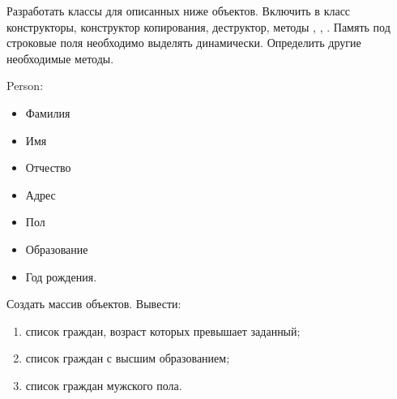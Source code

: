 
Разработать классы для описанных ниже объектов. Включить в класс
конструкторы, конструктор копирования, деструктор, методы ,
, . Память под строковые поля необходимо выделять
динамически. Определить другие необходимые методы.

Person:
\begin{itemize}
	\item Фамилия
	\item Имя
	\item Отчество
	\item Адрес
	\item Пол
	\item Образование
	\item Год рождения.
\end{itemize}

Создать массив объектов. Вывести:
\begin{enumerate}
	\item список граждан, возраст которых превышает заданный;
	\item список граждан с высшим образованием;
	\item список граждан мужского пола.
\end{enumerate}
